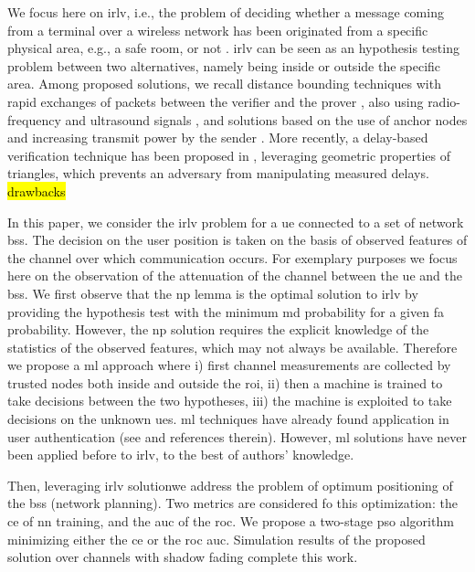 \documentclass[conference,draftcls,onecolumn]{IEEEtran}
\begin{document}
We focus here on  \ac{irlv}, i.e., the problem of deciding whether a message coming from a terminal over a wireless network has been originated from a specific physical area, e.g., a safe room, or not \cite{Zeng-survey}. \ac{irlv} can be seen as an hypothesis testing problem between two alternatives, namely being inside or outside the specific area. Among proposed solutions, we recall distance bounding techniques with rapid exchanges of packets between the verifier and the prover \cite{Brands}, also using radio-frequency and ultrasound signals \cite{Sastry}, and solutions based on the use of anchor nodes and increasing transmit power by the sender \cite{Vora}. More recently, a delay-based verification technique has been proposed  in \cite{7145434}, leveraging geometric properties of triangles, which prevents an adversary from manipulating measured delays. \hl{drawbacks}

In this paper, we consider the \ac{irlv} problem for a \ac{ue} connected to a set of network \acp{bs}. The decision on the user position is taken on the basis of observed features of the channel over which communication occurs. For exemplary purposes we focus here on the observation of the attenuation of the channel between the \ac{ue} and the \acp{bs}. We first observe that the  \ac{np} lemma \cite{Neyman289} is the optimal solution to \ac{irlv} by providing the hypothesis test with the minimum \ac{md} probability for a given \ac{fa} probability. However, the \ac{np} solution requires the explicit knowledge of the statistics of the observed features, which may not always be available. Therefore we propose a \ac{ml} approach  where i) first channel measurements are collected by trusted nodes both inside and outside the \ac{roi}, ii) then a machine is trained to take decisions between the two hypotheses, iii) the machine is exploited to take decisions on the unknown \acp{ue}. \ac{ml} techniques have already found application in user authentication (see  \cite{xiao-2018} and references therein). However, \ac{ml} solutions have never been applied before to \ac{irlv}, to the best of authors' knowledge. 

Then, leveraging \ac{irlv} solutionwe address the problem of optimum positioning of the \acp{bs} (network planning). Two metrics are considered fo this optimization: the \ac{ce} of \ac{nn} training, and the \ac{auc} of the \ac{roc}. We propose a two-stage \ac{pso} algorithm minimizing either the \ac{ce} or the \ac{roc} \ac{auc}. Simulation results of the proposed solution over channels with shadow fading complete this work.
\end{document}
